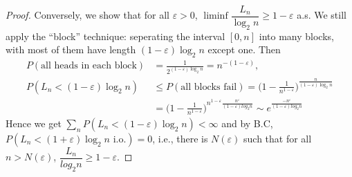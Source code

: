 \documentclass[11pt,singlecolumn, openany, citestyle=authoryear]{elegantbook}
\begin{document}
\begin{CJK}{UTF8}{gbsn}
\begin{proof}
    Conversely, we show that for all $\varepsilon>0$, $\liminf \dfrac{L_n}{\log_2 n}\geqslant 
    1-\varepsilon$ a.s. We still apply the ``block'' technique: seperating the interval $[0,n]$
    into many blocks, with most of them have length $(1-\varepsilon)\log_2 n$
    except one. Then 
\begin{align*}
    P(\text{all heads in each block})&=
    \frac{1}{2^{(1-\varepsilon)\log_2 n}}=n^{-(1-\varepsilon)},\\
    P(L_n < (1-\varepsilon)\log_2 n)&\leqslant P(\text{all blocks fail})=
    \biggl(
        1-\frac{1}{n^{1-\varepsilon}}
    \biggr)^{\frac{n}{(1-\varepsilon)\log_2 n}}\\
    &=\biggl(
        1-\frac{1}{n^{1-\varepsilon}}
    \biggr)^{n^{1-\varepsilon}\frac{n^\varepsilon}{(1-\varepsilon)
    log_2 n}} \sim e^{\frac{-n^\varepsilon}{(1-\varepsilon)
    log_2 n}}
\end{align*}
Hence we get $\sum_n P(L_n < (1-\varepsilon)\log_2 n)<\infty$ and
by B.C, $P(L_n<(1+\varepsilon)\log_2 n \text{ i.o.})=0$, i.e., 
there is $N(\varepsilon)$ such that for all $n>N(\varepsilon)$, 
$\dfrac{L_n}{log_2 n}\geqslant 1- \varepsilon$.
\end{proof}


\end{CJK}
\end{document}
